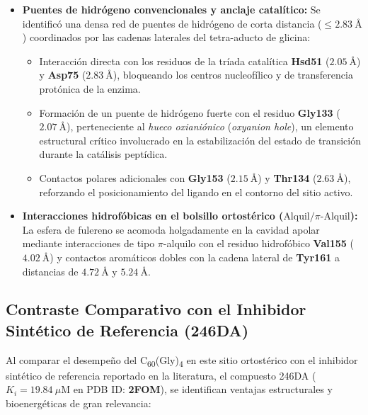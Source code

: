 \begin{itemize}
    \item \textbf{Puentes de hidrógeno convencionales y anclaje catalítico:} Se identificó una densa red de puentes de hidrógeno de corta distancia ($\le 2.83\ \text{\AA}$) coordinados por las cadenas laterales del tetra-aducto de glicina:
    \begin{itemize}
        \item Interacción directa con los residuos de la tríada catalítica \textbf{Hsd51} ($2.05\ \text{\AA}$) y \textbf{Asp75} ($2.83\ \text{\AA}$), bloqueando los centros nucleofílico y de transferencia protónica de la enzima.
        \item Formación de un puente de hidrógeno fuerte con el residuo \textbf{Gly133} ($2.07\ \text{\AA}$), perteneciente al \textit{hueco oxianiónico} (\textit{oxyanion hole}), un elemento estructural crítico involucrado en la estabilización del estado de transición durante la catálisis peptídica.
        \item Contactos polares adicionales con \textbf{Gly153} ($2.15\ \text{\AA}$) y \textbf{Thr134} ($2.63\ \text{\AA}$), reforzando el posicionamiento del ligando en el contorno del sitio activo.
    \end{itemize}
    
    \item \textbf{Interacciones hidrofóbicas en el bolsillo ortostérico ($\text{Alquil} / \pi\text{-Alquil}$):} La esfera de fulereno se acomoda holgadamente en la cavidad apolar mediante interacciones de tipo $\pi$-alquilo con el residuo hidrofóbico \textbf{Val155} ($4.02\ \text{\AA}$) y contactos aromáticos dobles con la cadena lateral de \textbf{Tyr161} a distancias de $4.72\ \text{\AA}$ y $5.24\ \text{\AA}$.
\end{itemize}

\subsection{Contraste Comparativo con el Inhibidor Sintético de Referencia (246DA)}

Al comparar el desempeño del C\textsubscript{60}(Gly)\textsubscript{4} en este sitio ortostérico con el inhibidor sintético de referencia reportado en la literatura, el compuesto 246DA ($K_i = 19.84\ \mu\text{M}$ en PDB ID: \textbf{2FOM}), se identifican ventajas estructurales y bioenergéticas de gran relevancia:

